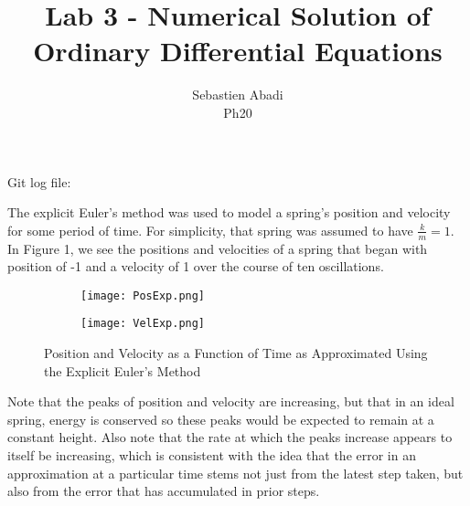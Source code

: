 \documentclass[10pt]{article}
\newenvironment{problem}[2][Problem]{\begin{trivlist}
\item[\hskip \labelsep {\bfseries #1}\hskip \labelsep {\bfseries #2.}]}{\end{trivlist}}
\begin{document}
Git log file:
\newpage
\title{Lab 3 - Numerical Solution of Ordinary Differential Equations}
\author{Sebastien Abadi\\
Ph20}
\maketitle
 
\begin{problem}{1} 
The explicit Euler's method was used to model a spring's position and velocity for some period of time. For simplicity, that spring was assumed to have $\frac{k}{m}=1$. In Figure 1, we see the positions and velocities of a spring that began with position of -1 and a velocity of 1 over the course of ten oscillations.
\begin{figure}[h]
\centering
\begin{subfigure}{.45\textwidth}
  \centering
  \texttt{[image: PosExp.png]}
\end{subfigure}%
\begin{subfigure}{.45\textwidth}
  \centering
  \texttt{[image: VelExp.png]}
\end{subfigure}
\caption{Position and Velocity as a Function of Time as Approximated Using the Explicit Euler's Method}
\end{figure}

Note that the peaks of position and velocity are increasing, but that in an ideal spring, energy is conserved so these peaks would be expected to remain at a constant height. Also note that the rate at which the peaks increase appears to itself be increasing, which is consistent with the idea that the error in an approximation at a particular time stems not just from the latest step taken, but also from the error that has accumulated in prior steps.

\end{problem}
\end{document}
